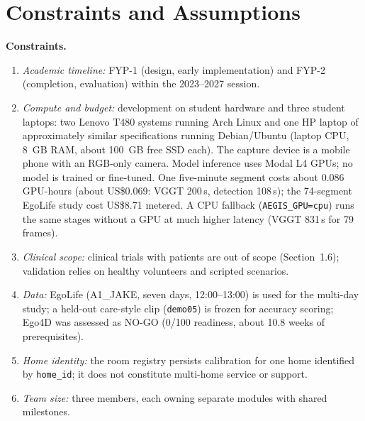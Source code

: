 \section{Constraints and Assumptions}
\label{sec:constraints}
\textbf{Constraints.}
\begin{enumerate}[label=\textbf{C\arabic*.},leftmargin=3em]
\item \emph{Academic timeline:} FYP-1 (design, early implementation) and FYP-2
(completion, evaluation) within the 2023--2027 session.
\item \emph{Compute and budget:} development on student hardware and
three student laptops: two Lenovo T480 systems running Arch Linux and one HP laptop of approximately similar specifications running Debian/Ubuntu (laptop CPU, 8~GB RAM, about 100~GB free SSD each). The capture device is a mobile phone with an RGB-only camera. Model inference uses Modal L4 GPUs; no model is trained or fine-tuned. One five-minute segment costs about 0.086 GPU-hours (about US\$0.069: VGGT 200\,s, detection 108\,s); the 74-segment EgoLife study cost US\$8.71 metered. A CPU fallback (\texttt{AEGIS\_GPU=cpu}) runs the same stages without a GPU at much higher latency (VGGT 831\,s for 79 frames).
\item \emph{Clinical scope:} clinical trials with patients are out of scope
(Section~1.6); validation relies on healthy volunteers and scripted scenarios.

\item \emph{Data:} EgoLife (A1\_JAKE, seven days, 12:00--13:00) is used for the multi-day study; a held-out care-style clip (\texttt{demo05}) is frozen for accuracy scoring; Ego4D was assessed as NO-GO (0/100 readiness, about 10.8 weeks of prerequisites).
\item \emph{Home identity:} the room registry persists calibration for one
home identified by \texttt{home\_id}; it does not constitute multi-home service
or support. 
\item \emph{Team size:} three members, each owning separate modules with shared
milestones.
\end{enumerate}

